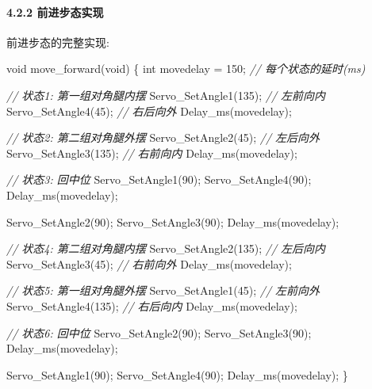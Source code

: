 \documentclass[
]{article}
\newenvironment{Shaded}{}{}
\newcommand{\CommentTok}[1]{\textcolor[rgb]{0.38,0.63,0.69}{\textit{#1}}}
\newcommand{\DataTypeTok}[1]{\textcolor[rgb]{0.56,0.13,0.00}{#1}}
\newcommand{\DecValTok}[1]{\textcolor[rgb]{0.25,0.63,0.44}{#1}}
\newcommand{\NormalTok}[1]{#1}
\begin{document}
\hypertarget{ux524dux8fdbux6b65ux6001ux5b9eux73b0}{%
\paragraph{4.2.2
前进步态实现}\label{ux524dux8fdbux6b65ux6001ux5b9eux73b0}}

前进步态的完整实现:

\begin{Shaded}
\begin{Highlighting}[]
\DataTypeTok{void}\NormalTok{ move\_forward(}\DataTypeTok{void}\NormalTok{)}
\NormalTok{\{}
    \DataTypeTok{int}\NormalTok{ movedelay = }\DecValTok{150}\NormalTok{;  }\CommentTok{// 每个状态的延时(ms)}
    
    \CommentTok{// 状态1: 第一组对角腿内摆}
\NormalTok{    Servo\_SetAngle1(}\DecValTok{135}\NormalTok{);  }\CommentTok{// 左前向内}
\NormalTok{    Servo\_SetAngle4(}\DecValTok{45}\NormalTok{);   }\CommentTok{// 右后向外}
\NormalTok{    Delay\_ms(movedelay);}
    
    \CommentTok{// 状态2: 第二组对角腿外摆}
\NormalTok{    Servo\_SetAngle2(}\DecValTok{45}\NormalTok{);   }\CommentTok{// 左后向外}
\NormalTok{    Servo\_SetAngle3(}\DecValTok{135}\NormalTok{);  }\CommentTok{// 右前向内}
\NormalTok{    Delay\_ms(movedelay);}
    
    \CommentTok{// 状态3: 回中位}
\NormalTok{    Servo\_SetAngle1(}\DecValTok{90}\NormalTok{);}
\NormalTok{    Servo\_SetAngle4(}\DecValTok{90}\NormalTok{);}
\NormalTok{    Delay\_ms(movedelay);}
    
\NormalTok{    Servo\_SetAngle2(}\DecValTok{90}\NormalTok{);}
\NormalTok{    Servo\_SetAngle3(}\DecValTok{90}\NormalTok{);}
\NormalTok{    Delay\_ms(movedelay);}
    
    \CommentTok{// 状态4: 第二组对角腿内摆}
\NormalTok{    Servo\_SetAngle2(}\DecValTok{135}\NormalTok{);  }\CommentTok{// 左后向内}
\NormalTok{    Servo\_SetAngle3(}\DecValTok{45}\NormalTok{);   }\CommentTok{// 右前向外}
\NormalTok{    Delay\_ms(movedelay);}
    
    \CommentTok{// 状态5: 第一组对角腿外摆}
\NormalTok{    Servo\_SetAngle1(}\DecValTok{45}\NormalTok{);   }\CommentTok{// 左前向外}
\NormalTok{    Servo\_SetAngle4(}\DecValTok{135}\NormalTok{);  }\CommentTok{// 右后向内}
\NormalTok{    Delay\_ms(movedelay);}
    
    \CommentTok{// 状态6: 回中位}
\NormalTok{    Servo\_SetAngle2(}\DecValTok{90}\NormalTok{);}
\NormalTok{    Servo\_SetAngle3(}\DecValTok{90}\NormalTok{);}
\NormalTok{    Delay\_ms(movedelay);}
    
\NormalTok{    Servo\_SetAngle1(}\DecValTok{90}\NormalTok{);}
\NormalTok{    Servo\_SetAngle4(}\DecValTok{90}\NormalTok{);}
\NormalTok{    Delay\_ms(movedelay);}
\NormalTok{\}}
\end{Highlighting}
\end{Shaded}
\end{document}
